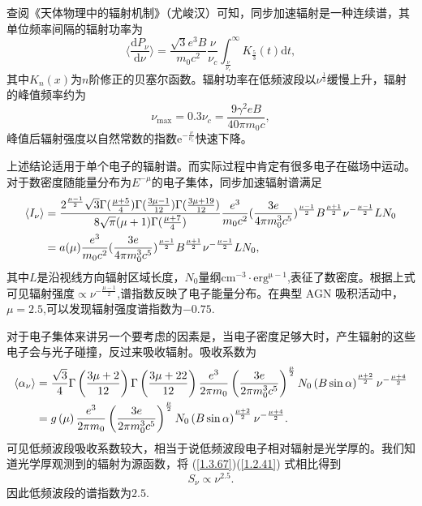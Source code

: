 \documentclass[../天体物理基础.tex]{subfiles}
\begin{document}
查阅《天体物理中的辐射机制》（尤峻汉）可知，同步加速辐射是一种连续谱，其单位频率间隔的辐射功率为
\begin{equation}
\langle\frac{\mathrm{d}P_\nu}{\mathrm{d}\nu}\rangle=\frac{\sqrt3e^3B}{m_0c^2}\frac{\nu}{\nu_c}\int_{\frac{\nu}{\nu_c}}^\infty K_\frac53(t)\mathrm{d}t,
\end{equation}
其中$K_{n}\left(x\right)$为$n$阶修正的贝塞尔函数。辐射功率在低频波段以$\nu^{\frac{1}{3}}$缓慢上升，辐射的峰值频率约为
\begin{equation}
\nu_{\max}=0.3\nu_{c}=\frac{9\gamma^2eB}{40\pi m_0c},
\end{equation}
峰值后辐射强度以自然常数的指数$\mathrm{e}^{-\frac{\nu}{\nu_{c}}}$快速下降。

上述结论适用于单个电子的辐射谱。而实际过程中肯定有很多电子在磁场中运动。对于数密度随能量分布为$E^{-\mu}$的电子集体，同步加速辐射谱满足
\begin{align}
\langle I_{\nu}\rangle&=\frac{2^{\frac{\mu-1}{2}}\sqrt3\Gamma(\frac{\mu+5}{4})\Gamma(\frac{3\mu-1}{12})\Gamma(\frac{3\mu+19}{12})}{8\sqrt\pi(\mu+1)\Gamma(\frac{\mu+7}{4})}\frac{e^{3}}{m_{0}c^{2}}(\frac{3e}{4\pi m_{0}^{3}c^{5}})^{\frac{\mu-1}2}B^{\frac{\mu+1}{2}}\nu^{-\frac{\mu-1}{2}}LN_{0}\notag\\
&=a(\mu)\frac{e^{3}}{m_{0}c^{2}}(\frac{3e}{4\pi m_{0}^{3}c^{5}})^{\frac{\mu-1}2}B^{\frac{\mu+1}{2}}\nu^{-\frac{\mu-1}{2}}LN_{0},\label{1.3.67}
\end{align}
其中$L$是沿视线方向辐射区域长度，$N_{0}$量纲$\mathrm{cm^{-3}\cdot erg^{\mu-1}}$,表征了数密度。根据上式可见辐射强度$\propto{}\nu^{-\frac{\mu-1}{2}}$,谱指数反映了电子能量分布。在典型 AGN 吸积活动中，$\mu=2.5$,可以发现辐射强度谱指数为$-0.75$.

对于电子集体来讲另一个要考虑的因素是，当电子密度足够大时，产生辐射的这些电子会与光子碰撞，反过来吸收辐射。吸收系数为
\begin{align}
\langle{}\alpha_{\nu}\rangle&=\frac{\sqrt{3}}{4}\Gamma\left(\frac{3\mu+2}{12}\right)\Gamma\left(\frac{3\mu+22}{12}\right)\frac{e^{3}}{2\pi m_{0}}\left(\frac{3e}{2\pi m_{0}^{3}c^{5}}\right)^{\frac{\mu}{2}}N_{0}\left(B\sin\alpha\right)^{\frac{\mu+2}{2}}\nu^{-\frac{\mu+4}{2}}\notag\\
&=g\left(\mu\right)\frac{e^{3}}{2\pi m_{0}}\left(\frac{3e}{2\pi m_{0}^{3}c^{5}}\right)^{\frac{\mu}{2}}N_{0}\left(B\sin\alpha\right)^{\frac{\mu+2}{2}}\nu^{-\frac{\mu+4}{2}}.\label{1.2.41}
\end{align}
可见低频波段吸收系数较大，相当于说低频波段电子相对辐射是光学厚的。我们知道光学厚观测到的辐射为源函数，将 (\ref{1.3.67})(\ref{1.2.41}) 式相比得到
\begin{equation}
S_{\nu}\propto{}\nu^{2.5}.
\end{equation}
因此低频波段的谱指数为$2.5$.
\end{document}
